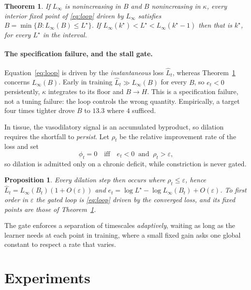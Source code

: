 \documentclass[10pt,twocolumn]{article}
\theoremstyle{plain}
\newtheorem{proposition}{Proposition}
\newtheorem{theorem}{Theorem}
\theoremstyle{definition}
\theoremstyle{remark}
\begin{document}
\begin{theorem}
\label{thm:autoreg}
If $L_\infty$ is nonincreasing in $B$ and $B$ nonincreasing in $\kappa$, every interior
fixed point of \eqref{eq:loop} driven by $L_\infty$ satisfies
$B = \min\{B : L_\infty(B) \le L^\star\}$. If $L_\infty(k^\star) < L^\star <
L_\infty(k^\star-1)$ then that is $k^\star$, for \emph{every} $L^\star$ in the interval.
\end{theorem}

\paragraph{The specification failure, and the stall gate.}
Equation~\eqref{eq:loop} is driven by the \emph{instantaneous} loss $\widehat{L}_t$,
whereas Theorem~\ref{thm:autoreg} concerns $L_\infty(B)$. Early in training
$\widehat{L}_t \gg L_\infty(B)$ for every $B$, so $e_t < 0$ persistently, $\kappa$
integrates to its floor and $B \to H$. This is a specification failure, not a tuning
failure: the loop controls the wrong quantity. Empirically, a target four times tighter
drove $B$ to $13.3$ where $4$ sufficed.

In tissue, the vasodilatory signal is an accumulated byproduct, so dilation requires the
shortfall to \emph{persist}. Let $\rho_t$ be the relative improvement rate of the loss and
set
\begin{equation}
  \phi_t = 0 \quad\text{iff}\quad e_t < 0 \ \text{ and } \ \rho_t > \varepsilon ,
\end{equation}
so dilation is admitted only on a chronic deficit, while constriction is never gated.

\begin{proposition}
\label{prop:stall}
Every dilation step then occurs where $\rho_t \le \varepsilon$, hence
$\widehat{L}_t = L_\infty(B_t)(1 + O(\varepsilon))$ and
$e_t = \log L^\star - \log L_\infty(B_t) + O(\varepsilon)$. To first order in
$\varepsilon$ the gated loop is \eqref{eq:loop} driven by the converged loss, and its
fixed points are those of Theorem~\ref{thm:autoreg}.
\end{proposition}

The gate enforces a separation of timescales \emph{adaptively}, waiting as long as the
learner needs at each point in training, where a small fixed gain asks one global constant
to respect a rate that varies.

\section{Experiments}
\end{document}

